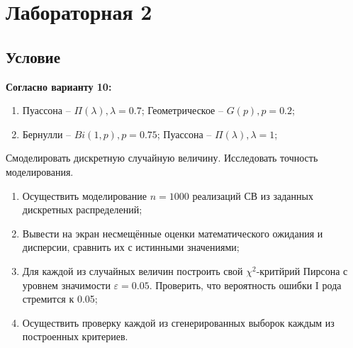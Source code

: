 \section{Лабораторная 2}

\subsection{Условие}

\textbf{Согласно варианту 10:}
\begin{enumerate}
	\item Пуассона – $\Pi(\lambda), \lambda = 0.7$; Геометрическое – $G(p), p = 0.2$;
	\item Бернулли – $Bi(1, p), p = 0.75$; Пуассона – $\Pi(\lambda), \lambda = 1$;
\end{enumerate}

Смоделировать дискретную случайную величину. Исследовать точность моделирования.

\begin{enumerate}
	\item Осуществить моделирование $n = 1000$ реализаций СВ из заданных дискретных распределений;
	\item Вывести на экран несмещённые оценки математического ожидания и дисперсии, сравнить их с истинными значениями;
	\item Для каждой из случайных величин построить свой $\chi^{2}$-критйрий Пирсона с уровнем значимости $\varepsilon = 0.05$. Проверить, что вероятность ошибки I рода стремится к 0.05;
	\item Осуществить проверку каждой из сгенерированных выборок каждым из построенных критериев.
\end{enumerate}
